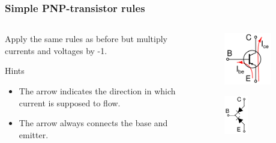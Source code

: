 \documentclass[beamer]{standalone}
\begin{document}
\begin{frame}
\frametitle{Simple PNP-transistor rules}
\begin{columns}[t]
 \begin{column}{.65\textwidth}
  Apply the same rules as before but multiply currents and voltages by
  -1.

  Hints 
  \begin{itemize}
   \item 
    The arrow indicates the direction in which current is supposed to
    flow.
   \item 
    The arrow always connects the base and emitter.
  \end{itemize}
 \end{column}
 \begin{column}{.25\textwidth}
  \begin{figure}
   \includegraphics[width=0.80\textwidth]{./schematics/pnp_transistor_with_currents.pdf}
  \end{figure}
  \begin{figure}
   \includegraphics[width=0.40\textwidth]{./schematics/pnp_diodes.pdf}
  \end{figure}
 \end{column}
\end{columns}
\end{frame}
\end{document}

